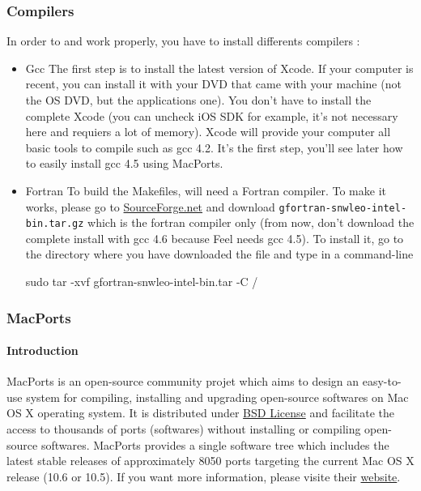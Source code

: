 \subsubsection{Compilers}

In order to \feel and \cmake work properly, you have to install differents compilers :
\begin{itemize}
\item Gcc
The first step is to install the latest version of Xcode. If your computer is recent, you can install it with your DVD that came with your machine (not the OS DVD, but the applications one). You don't have to install the complete Xcode (you can uncheck iOS SDK for example, it's not necessary here and requiers a lot of memory). Xcode will provide your computer all basic tools to compile such as gcc 4.2. It's the first step, you'll see later how to easily install gcc 4.5 using MacPorts.
\item Fortran
To build the Makefiles, \cmake will need a Fortran compiler. To make it works, please go to \href{http://hpc.sourceforge.net/}{SourceForge.net} and download \verb|gfortran-snwleo-intel-bin.tar.gz| which is the fortran compiler only (from now, don't download the complete install with gcc 4.6 because Feel needs gcc 4.5). To install it, go to the directory where you have downloaded the file and type in a command-line
\begin{unixcom}
		sudo tar -xvf gfortran-snwleo-intel-bin.tar -C /
\end{unixcom}

\end{itemize}

\subsubsection{MacPorts}

\paragraph{Introduction}
MacPorts is an open-source community projet which aims to design an easy-to-use system for compiling, installing and upgrading open-source softwares on Mac OS X operating system. It is distributed under \href{http://opensource.org/licenses/bsd-license.php}{BSD License} and facilitate the access to thousands of ports (softwares) without installing or compiling open-source softwares.
MacPorts provides a single software tree which includes the latest stable releases of approximately 8050 ports targeting the current Mac OS X release (10.6 or 10.5). If you want more information, please visite their \href{http://www.macports.org/}{website}.

